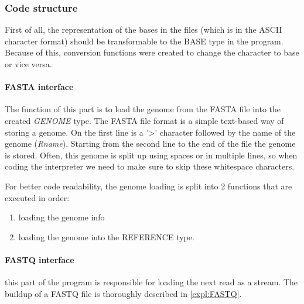\subsubsection{Code structure}

First of all, the representation of the bases in the files (which is in the ASCII character format) should be transformable to the BASE type in the program. Because of this, conversion functions were created to change the character to base or vice versa.

\paragraph{FASTA interface} The function of this part is to load the genome from the FASTA file into the created \emph{GENOME} type. 
The FASTA file format is a simple text-based way of storing a genome. On the first line is a '>' character followed by the name of the genome (\emph{Rname}). Starting from the second line to the end of the file the genome is stored. Often, this genome is split up using spaces or in multiple lines, so when coding the interpreter we need to make sure to skip these whitespace characters.

For better code readability, the genome loading is split into 2 functions that are executed in order:
\begin{enumerate}
	\item loading the genome info
	\item loading the genome into the REFERENCE type. 
\end{enumerate}

\paragraph{FASTQ interface} this part of the program is responsible for loading the next read as a stream. The buildup of a FASTQ file is thoroughly described in \ref{expl:FASTQ}.

